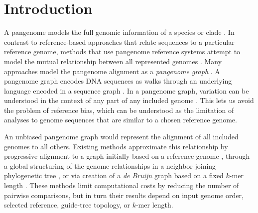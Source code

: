 \documentclass{bioinfo}
\theoremstyle{definition}
\begin{document}
\maketitle


\section{Introduction}
\label{sec:introduction}
A pangenome models the full genomic information of a species or clade \citep{Medini_2005,Sherman_2020}.
In contrast to reference-based approaches that relate sequences to a particular reference genome, methods that use pangenome reference systems attempt to model the mutual relationship between all represented genomes \citep{cpang2018}.
Many approaches model the pangenome alignment as a \textit{pangenome graph} \citep{Garrison_2018,Yokoyama2019,Hickey:2020}.
A pangenome graph encodes DNA sequences as walks through an underlying language encoded in a sequence graph \citep{Hein_1989}.
In a pangenome graph, variation can be understood in the context of any part of any included genome  \citep{Eizenga_2020}.
This lets us avoid the problem of reference bias, which can be understood as the limitation of analyses to genome sequences that are similar to a chosen reference genome.

An unbiased pangenome graph would represent the alignment of all included genomes to all others.
Existing methods approximate this relationship by progressive alignment to a graph initially based on a reference genome \citep{Li:2020}, through a global structuring of the genome relationships in a neighbor joining phylogenetic tree \citep{Armstrong:2020}, or via creation of a \textit{de Bruijn} graph based on a fixed $k$-mer length \citep{Minkin_2016,Yu_2021}.
These methods limit computational costs by reducing the number of pairwise comparisons, but in turn their results depend on input genome order, selected reference, guide-tree topology, or $k$-mer length.
\end{document}
